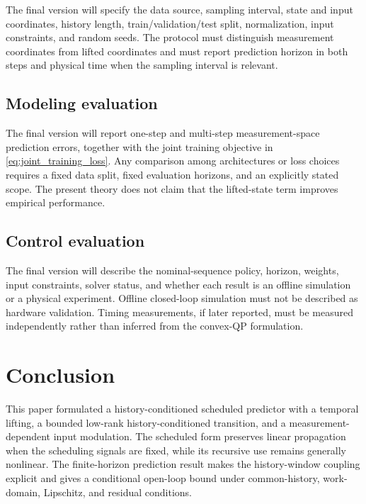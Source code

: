 \documentclass[journal]{IEEEtran}
\begin{document}
The final version will specify the data source, sampling interval, state and input coordinates, history length, train/validation/test split, normalization, input constraints, and random seeds. The protocol must distinguish measurement coordinates from lifted coordinates and must report prediction horizon in both steps and physical time when the sampling interval is relevant.

\subsection{Modeling evaluation}

The final version will report one-step and multi-step measurement-space prediction errors, together with the joint training objective in \eqref{eq:joint_training_loss}. Any comparison among architectures or loss choices requires a fixed data split, fixed evaluation horizons, and an explicitly stated scope. The present theory does not claim that the lifted-state term improves empirical performance.

\subsection{Control evaluation}

The final version will describe the nominal-sequence policy, horizon, weights, input constraints, solver status, and whether each result is an offline simulation or a physical experiment. Offline closed-loop simulation must not be described as hardware validation. Timing measurements, if later reported, must be measured independently rather than inferred from the convex-QP formulation.

\section{Conclusion}
\label{sec:conclusion}

This paper formulated a history-conditioned scheduled predictor with a temporal lifting, a bounded low-rank history-conditioned transition, and a measurement-dependent input modulation. The scheduled form preserves linear propagation when the scheduling signals are fixed, while its recursive use remains generally nonlinear. The finite-horizon prediction result makes the history-window coupling explicit and gives a conditional open-loop bound under common-history, work-domain, Lipschitz, and residual conditions.
\end{document}
